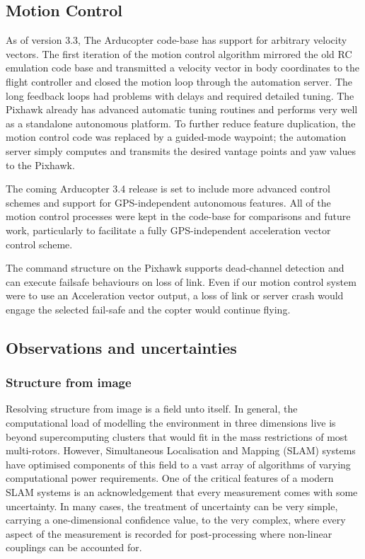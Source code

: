 \documentclass[a4paper, 11pt, titlepage]{article}
\begin{document}
  \subsection{Motion Control}
    As of version 3.3, The Arducopter code-base has support for arbitrary velocity vectors.  The first iteration of the motion control algorithm mirrored the old RC emulation code base and transmitted a velocity vector in body coordinates to the flight controller and closed the motion loop through the automation server.  The long feedback loops had problems with delays and required detailed tuning.
    The Pixhawk already has advanced automatic tuning routines and performs very well as a standalone autonomous platform.  To further reduce feature duplication, the motion control code was replaced by a guided-mode waypoint; the automation server simply computes and transmits the desired vantage points and yaw values to the Pixhawk.

    The coming Arducopter 3.4 release is set to include more advanced control schemes and support for GPS-independent autonomous features.  All of the motion control processes were kept in the code-base for comparisons and future work, particularly to facilitate a fully GPS-independent acceleration vector control scheme.

    The command structure on the Pixhawk supports dead-channel detection and can execute failsafe behaviours on loss of link.  Even if our motion control system were to use an Acceleration vector output, a loss of link or server crash would engage the selected fail-safe and the copter would continue flying.


  \subsection{Observations and uncertainties}
    \subsubsection{Structure from image}
      Resolving structure from image is a field unto itself.  In general, the computational load of modelling the environment in three dimensions live is beyond supercomputing clusters that would fit in the mass restrictions of most multi-rotors.  However, Simultaneous Localisation and Mapping (SLAM) systems have optimised components of this field to a vast array of algorithms of varying computational power requirements.
      One of the critical features of a modern SLAM systems is an acknowledgement that every measurement comes with some uncertainty. 
      In many cases, the treatment of uncertainty can be very simple, carrying a one-dimensional confidence value, to the very complex, where every aspect of the measurement is recorded for post-processing where non-linear couplings can be accounted for.
\end{document}
